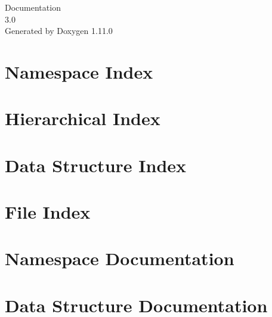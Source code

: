 \documentclass[twoside]{book}
\newcommand{\+}{\discretionary{\mbox{\scriptsize$\hookleftarrow$}}{}{}}
\newcommand{\clearemptydoublepage}{%
    \newpage{\pagestyle{empty}\cleardoublepage}%
  }
\begin{document}
  \raggedbottom
    \hypersetup{pageanchor=false,
                bookmarksnumbered=true,
                pdfencoding=unicode
               }
  \begin{titlepage}
  \vspace*{7cm}
  \begin{center}%
  {\Large Documentation}\\
  [1ex]\large 3.\+0 \\
  \vspace*{1cm}
  {\large Generated by Doxygen 1.11.0}\\
  \end{center}
  \end{titlepage}
  \clearemptydoublepage
  \tableofcontents
  \clearemptydoublepage
  \hypersetup{pageanchor=true}




\chapter{Namespace Index}

\chapter{Hierarchical Index}

\chapter{Data Structure Index}

\chapter{File Index}

\chapter{Namespace Documentation}



\chapter{Data Structure Documentation}



















\end{document}
